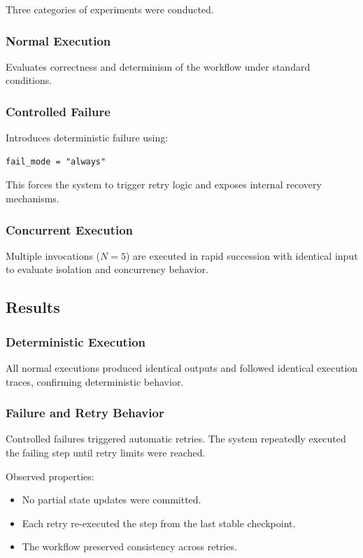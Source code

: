 Three categories of experiments were conducted.

\subsubsection{Normal Execution}

Evaluates correctness and determinism of the workflow under standard conditions.

\subsubsection{Controlled Failure}

Introduces deterministic failure using:

\begin{verbatim}
fail_mode = "always"
\end{verbatim}

This forces the system to trigger retry logic and exposes internal recovery mechanisms.

\subsubsection{Concurrent Execution}

Multiple invocations ($N=5$) are executed in rapid succession with identical input to evaluate isolation and concurrency behavior.

\subsection{Results}

\subsubsection{Deterministic Execution}

All normal executions produced identical outputs and followed identical execution traces, confirming deterministic behavior.

\subsubsection{Failure and Retry Behavior}

Controlled failures triggered automatic retries. The system repeatedly executed the failing step until retry limits were reached.

Observed properties:

\begin{itemize}
    \item No partial state updates were committed.
    \item Each retry re-executed the step from the last stable checkpoint.
    \item The workflow preserved consistency across retries.
\end{itemize}

